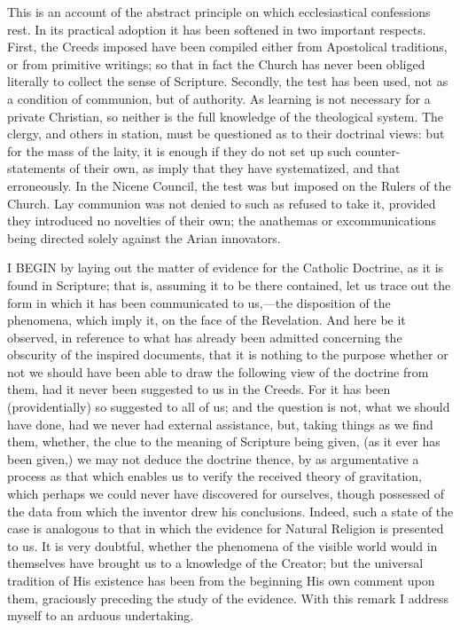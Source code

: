 This is an account of the abstract principle on which
ecclesiastical confessions rest. In its practical adoption it has been
softened in two important respects. First, the Creeds imposed have
been compiled either from Apostolical traditions, or from primitive
writings; so that in fact the Church has never been obliged literally
to collect the sense of Scripture. Secondly, the test has been used,
not as a condition of communion, but of authority. As learning is not
necessary for a private Christian, so neither is the full knowledge of
the theological system. The clergy, and others in station, must
be questioned as to their doctrinal views: but for the mass of the
laity, it is enough if they do not set up such counter-statements of
their own, as imply that they have systematized, and that erroneously.
In the Nicene Council, the test was but imposed on the Rulers of the
Church. Lay communion was not denied to such as refused to take it,
provided they introduced no novelties of their own; the anathemas or
excommunications being directed solely against the Arian innovators.


I BEGIN by laying out the matter of
evidence for the Catholic Doctrine, as it is found in Scripture; that
is, assuming it to be there contained, let us trace out the form in
which it has been communicated to us,—the disposition of the
phenomena, which imply it, on the face of the Revelation. And here be
it observed, in reference to what has already been admitted concerning
the obscurity of the inspired documents, that it is nothing to the
purpose whether or not we should have been able to draw the following
view of the doctrine from them, had it never been suggested to us in
the Creeds. For it has been (providentially) so suggested to all of
us; and the question is not, what we should have done, had we never
had external assistance, but, taking things as we find them, whether,
the clue to the meaning of Scripture being given, (as it ever has been
given,) we may not deduce the doctrine thence, by as argumentative a
process as that which enables us to verify the received theory of
gravitation, which perhaps we could never have discovered for
ourselves, though possessed of the data from which the inventor drew
his conclusions. Indeed, such a state of the case is analogous to that
in which the evidence for Natural Religion is presented to us. It is
very doubtful, whether the phenomena of the visible world would
in themselves have brought us to a knowledge of the Creator; but the
universal tradition of His existence has been from the beginning His
own comment upon them, graciously preceding the study of the evidence.
With this remark I address myself to an arduous undertaking.

